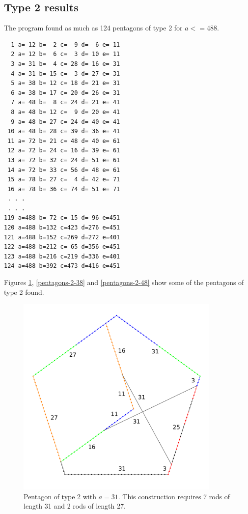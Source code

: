 \documentclass[11pt]{article}
\begin{document}
\subsection{Type 2 results}
The program found as much as 124 pentagons of type 2 for $a <= 488$.

\begin{lstlisting}
  1 a= 12 b=  2 c=  9 d=  6 e= 11
  2 a= 12 b=  6 c=  3 d= 10 e= 11
  3 a= 31 b=  4 c= 28 d= 16 e= 31
  4 a= 31 b= 15 c=  3 d= 27 e= 31
  5 a= 38 b= 12 c= 18 d= 21 e= 31
  6 a= 38 b= 17 c= 20 d= 26 e= 31
  7 a= 48 b=  8 c= 24 d= 21 e= 41
  8 a= 48 b= 12 c=  9 d= 20 e= 41
  9 a= 48 b= 27 c= 24 d= 40 e= 41
 10 a= 48 b= 28 c= 39 d= 36 e= 41
 11 a= 72 b= 21 c= 48 d= 40 e= 61
 12 a= 72 b= 24 c= 16 d= 39 e= 61
 13 a= 72 b= 32 c= 24 d= 51 e= 61
 14 a= 72 b= 33 c= 56 d= 48 e= 61
 15 a= 78 b= 27 c=  4 d= 42 e= 71
 16 a= 78 b= 36 c= 74 d= 51 e= 71
 . . .
 . . .
119 a=488 b= 72 c= 15 d= 96 e=451
120 a=488 b=132 c=423 d=276 e=451
121 a=488 b=152 c=269 d=272 e=401
122 a=488 b=212 c= 65 d=356 e=451
123 a=488 b=216 c=219 d=336 e=401
124 a=488 b=392 c=473 d=416 e=451
\end{lstlisting}

Figures \ref{pentagons-2-31}, \ref{pentagons-2-38} and \ref{pentagons-2-48} show some of the pentagons of type 2 found.

\begin{figure}
\centering
\includegraphics[width=10cm]{figs/pentagons-2-31}
\caption{Pentagon of type 2 with $a=31$. This construction requires 7 rods of 
length 31 and 2 rods of length 27.}
\label{pentagons-2-31}
\end{figure}
\end{document}
